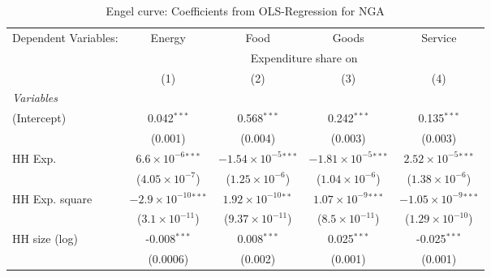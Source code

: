 
\begin{table}[htbp!]
   \centering
   \small
   \begin{adjustbox}{width = 1\textwidth, max height = 0.95\textheight, center}
      \begin{threeparttable}[b]
         \caption{\label{tab:Engel_parametric_NGA} Engel curve: Coefficients from OLS-Regression for NGA}
         \begin{tabular}{lcccc}
            \tabularnewline \midrule \midrule
            Dependent Variables: & Energy                         & Food                           & Goods                          & Service\\  
             & \multicolumn{4}{c}{Expenditure share on} \\ 
                                 & (1)                            & (2)                            & (3)                            & (4)\\  
            \midrule
            \emph{Variables}\\
            (Intercept)          & 0.042$^{***}$                  & 0.568$^{***}$                  & 0.242$^{***}$                  & 0.135$^{***}$\\   
                                 & (0.001)                        & (0.004)                        & (0.003)                        & (0.003)\\   
            HH Exp.              & $6.6\times 10^{-6}$$^{***}$    & $-1.54\times 10^{-5}$$^{***}$  & $-1.81\times 10^{-5}$$^{***}$  & $2.52\times 10^{-5}$$^{***}$\\    
                                 & ($4.05\times 10^{-7}$)         & ($1.25\times 10^{-6}$)         & ($1.04\times 10^{-6}$)         & ($1.38\times 10^{-6}$)\\    
            HH Exp. square       & $-2.9\times 10^{-10}$$^{***}$  & $1.92\times 10^{-10}$$^{**}$   & $1.07\times 10^{-9}$$^{***}$   & $-1.05\times 10^{-9}$$^{***}$\\    
                                 & ($3.1\times 10^{-11}$)         & ($9.37\times 10^{-11}$)        & ($8.5\times 10^{-11}$)         & ($1.29\times 10^{-10}$)\\    
            HH size (log)        & -0.008$^{***}$                 & 0.008$^{***}$                  & 0.025$^{***}$                  & -0.025$^{***}$\\   
                                 & (0.0006)                       & (0.002)                        & (0.001)                        & (0.001)\\   

\end{tabular}
\end{threeparttable}
\end{adjustbox}
\end{table}
